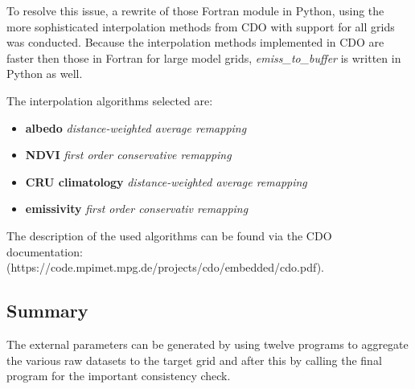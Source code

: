 \documentclass[a4paper,10pt,DIV14,BCOR1cm,titlepage,twoside]{scrartcl}
\begin{document}
\noindent To resolve this issue, a rewrite of those Fortran module in Python, using the more sophisticated interpolation methods
from CDO with support for all grids was conducted.  Because the interpolation methods implemented in CDO are faster then those
in Fortran for large model grids, \textit{emiss\_to\_buffer} is written in Python as well. 
\par\medskip\noindent

\noindent The interpolation algorithms selected are:

\begin{itemize}
\item \textbf{albedo} \textit{distance-weighted average remapping}
\item \textbf{NDVI} \textit{first order conservative remapping}
\item \textbf{CRU climatology} \textit{distance-weighted average remapping}
\item \textbf{emissivity} \textit{first order conservativ remapping}
\end{itemize}

The description of the used algorithms can be found via the CDO
documentation: 
\\
(https://code.mpimet.mpg.de/projects/cdo/embedded/cdo.pdf).
\\



\subsection{Summary}\label{Summary}
The external parameters can be generated by using twelve programs to aggregate the various raw datasets to the target grid and after this by calling the final program for the important consistency check.
\end{document}
